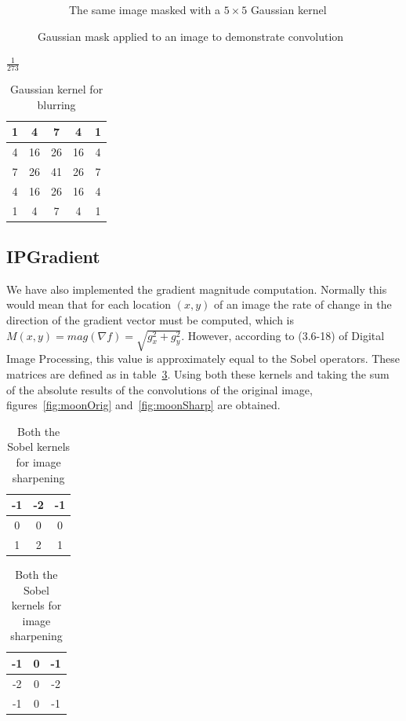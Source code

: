 \begin{figure}[!htb]
\begin{subfigure}[b]{0.49\linewidth}
  \caption{The same image masked with a \(5\times5\) Gaussian kernel}
  \label{fig:blur}
 \end{subfigure}
 \caption{Gaussian mask applied to an image to demonstrate convolution}
\end{figure}
\begin{table}[!htb]
\begin{center}
$\frac{1}{273}$
\begin{tabular}{|c|c|c|c|c|}\hline
1 & 4 & 7 & 4 & 1\\ \hline
4 &  16 &  26 &  16 &  4 \\ \hline
7 &  26 &  41 &  26 &  7\\ \hline
4 &  16 &  26 &  16 &  4\\ \hline
1 &  4 &  7 &  4 &  1 \\ \hline
\end{tabular}

\caption{Gaussian kernel for blurring}
\label{tbl:gauss}
\end{center}
\end{table}

\subsection*{IPGradient}
We have also implemented the gradient magnitude computation. Normally this would mean that for each location $(x, y)$ of an image the rate of change in the direction of the gradient vector must be computed, which is $M(x, y) = mag(\nabla f) = \sqrt{g_x ^2 + g_y ^2}$. However, according to (3.6-18) of Digital Image Processing, this value is approximately equal to the Sobel operators. These matrices are defined as in table~\ref{tbl:sobel}. Using both these kernels and taking the sum of the absolute results of the convolutions of the original image, figures~\ref{fig:moonOrig} and~\ref{fig:moonSharp} are obtained. 
\begin{table}[!htb]
\begin{center}
\begin{tabular}{|c|c|c|}\hline
-1 & -2 & -1 \\ \hline
0 & 0 & 0 \\ \hline
1 & 2 & 1 \\ \hline
\end{tabular}
\begin{tabular}{|c|c|c|}\hline
-1 & 0 & -1 \\ \hline
-2 & 0 & -2 \\ \hline
-1 & 0 & -1 \\ \hline
\end{tabular}

\caption{Both the Sobel kernels for image sharpening}
\label{tbl:sobel}
\end{center}
\end{table}

